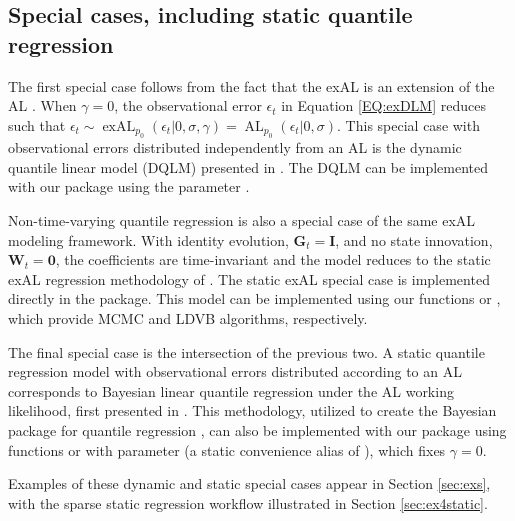 \documentclass{jss}
\newcommand{\mat}[1]{\mathbf{#1}}
\newcommand{\AL}{\operatorname{AL}}
\newcommand{\exAL}{\operatorname{exAL}}
\begin{document}
\subsection{Special cases, including static quantile regression}
\label{sec:special}

The first special case follows from the fact that the exAL is an extension of the AL \citep{yan2025family}. When $\gamma = 0$, the
observational error $\epsilon_t$ in Equation \eqref{EQ:exDLM} reduces such that $\epsilon_t \sim \exAL_{p_0}(\epsilon_t |0,\sigma,\gamma) = \AL_{p_0}(\epsilon_t |0,\sigma)$. This special case with observational errors distributed independently from an AL is the dynamic quantile linear model (DQLM) presented in \cite{gonccalves2017dynamic}. The DQLM can be implemented with our package using the parameter .

Non-time-varying quantile regression is also a special case of the same exAL modeling framework. With identity evolution, $\mat{G}_t=\mat{I}$, and no state innovation, $\mat{W}_t=\mat{0}$, the coefficients are time-invariant and the model reduces to the static exAL regression methodology of \cite{yan2025family}. The static exAL special case is implemented directly in the package. This model can be implemented using our functions  or , which provide MCMC and LDVB algorithms, respectively.

The final special case is the intersection of the previous two. A static quantile regression model with observational errors distributed according to an AL corresponds to Bayesian linear quantile regression under the AL working likelihood, first presented in \cite{yu2001bayesian}. This methodology, utilized to create the Bayesian package for quantile regression , can also be implemented with our package using functions  or  with parameter  (a static convenience alias of ), which fixes $\gamma = 0$.

Examples of these dynamic and static special cases appear in Section \ref{sec:exs}, with the sparse static regression workflow illustrated in Section \ref{sec:ex4static}.

\end{document}
